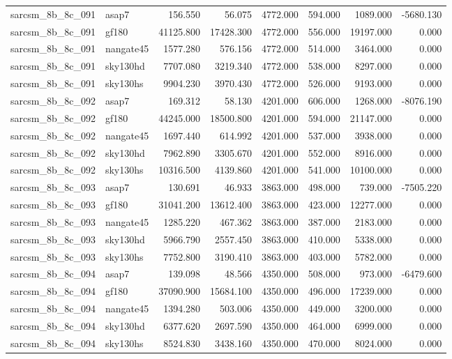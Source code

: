 \begin{tabular}{llrrrrrr}
sarcsm\_8b\_8c\_091 & asap7 & 156.550 & 56.075 & 4772.000 & 594.000 & 1089.000 & -5680.130 \\
sarcsm\_8b\_8c\_091 & gf180 & 41125.800 & 17428.300 & 4772.000 & 556.000 & 19197.000 & 0.000 \\
sarcsm\_8b\_8c\_091 & nangate45 & 1577.280 & 576.156 & 4772.000 & 514.000 & 3464.000 & 0.000 \\
sarcsm\_8b\_8c\_091 & sky130hd & 7707.080 & 3219.340 & 4772.000 & 538.000 & 8297.000 & 0.000 \\
sarcsm\_8b\_8c\_091 & sky130hs & 9904.230 & 3970.430 & 4772.000 & 526.000 & 9193.000 & 0.000 \\
sarcsm\_8b\_8c\_092 & asap7 & 169.312 & 58.130 & 4201.000 & 606.000 & 1268.000 & -8076.190 \\
sarcsm\_8b\_8c\_092 & gf180 & 44245.000 & 18500.800 & 4201.000 & 594.000 & 21147.000 & 0.000 \\
sarcsm\_8b\_8c\_092 & nangate45 & 1697.440 & 614.992 & 4201.000 & 537.000 & 3938.000 & 0.000 \\
sarcsm\_8b\_8c\_092 & sky130hd & 7962.890 & 3305.670 & 4201.000 & 552.000 & 8916.000 & 0.000 \\
sarcsm\_8b\_8c\_092 & sky130hs & 10316.500 & 4139.860 & 4201.000 & 541.000 & 10100.000 & 0.000 \\
sarcsm\_8b\_8c\_093 & asap7 & 130.691 & 46.933 & 3863.000 & 498.000 & 739.000 & -7505.220 \\
sarcsm\_8b\_8c\_093 & gf180 & 31041.200 & 13612.400 & 3863.000 & 423.000 & 12277.000 & 0.000 \\
sarcsm\_8b\_8c\_093 & nangate45 & 1285.220 & 467.362 & 3863.000 & 387.000 & 2183.000 & 0.000 \\
sarcsm\_8b\_8c\_093 & sky130hd & 5966.790 & 2557.450 & 3863.000 & 410.000 & 5338.000 & 0.000 \\
sarcsm\_8b\_8c\_093 & sky130hs & 7752.800 & 3190.410 & 3863.000 & 403.000 & 5782.000 & 0.000 \\
sarcsm\_8b\_8c\_094 & asap7 & 139.098 & 48.566 & 4350.000 & 508.000 & 973.000 & -6479.600 \\
sarcsm\_8b\_8c\_094 & gf180 & 37090.900 & 15684.100 & 4350.000 & 496.000 & 17239.000 & 0.000 \\
sarcsm\_8b\_8c\_094 & nangate45 & 1394.280 & 503.006 & 4350.000 & 449.000 & 3200.000 & 0.000 \\
sarcsm\_8b\_8c\_094 & sky130hd & 6377.620 & 2697.590 & 4350.000 & 464.000 & 6999.000 & 0.000 \\
sarcsm\_8b\_8c\_094 & sky130hs & 8524.830 & 3438.160 & 4350.000 & 470.000 & 8024.000 & 0.000 \\

\end{tabular}
